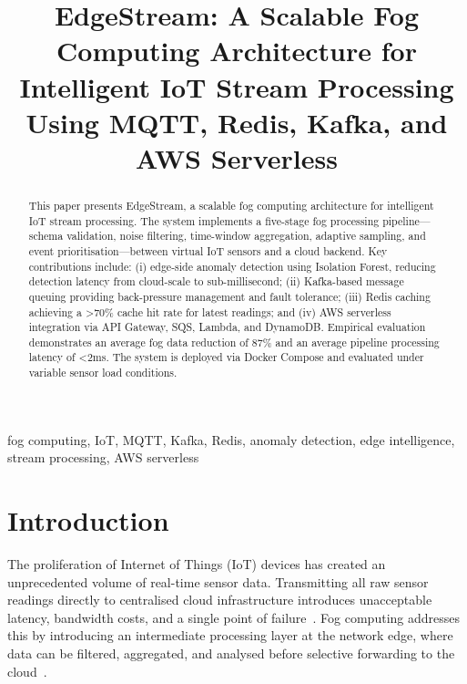 \documentclass[conference]{IEEEtran}
\begin{document}
\title{EdgeStream: A Scalable Fog Computing Architecture for Intelligent IoT Stream Processing Using MQTT, Redis, Kafka, and AWS Serverless}

\author{
}

\maketitle

\begin{abstract}
This paper presents EdgeStream, a scalable fog computing architecture for intelligent IoT stream processing. The system implements a five-stage fog processing pipeline—schema validation, noise filtering, time-window aggregation, adaptive sampling, and event prioritisation—between virtual IoT sensors and a cloud backend. Key contributions include: (i) edge-side anomaly detection using Isolation Forest, reducing detection latency from cloud-scale to sub-millisecond; (ii) Kafka-based message queuing providing back-pressure management and fault tolerance; (iii) Redis caching achieving a \textgreater70\% cache hit rate for latest readings; and (iv) AWS serverless integration via API Gateway, SQS, Lambda, and DynamoDB. Empirical evaluation demonstrates an average fog data reduction of 87\% and an average pipeline processing latency of \textless2ms. The system is deployed via Docker Compose and evaluated under variable sensor load conditions.
\end{abstract}

\begin{IEEEkeywords}
fog computing, IoT, MQTT, Kafka, Redis, anomaly detection, edge intelligence, stream processing, AWS serverless
\end{IEEEkeywords}

\section{Introduction}

The proliferation of Internet of Things (IoT) devices has created an unprecedented volume of real-time sensor data. Transmitting all raw sensor readings directly to centralised cloud infrastructure introduces unacceptable latency, bandwidth costs, and a single point of failure~\cite{bonomi2012fog}. Fog computing addresses this by introducing an intermediate processing layer at the network edge, where data can be filtered, aggregated, and analysed before selective forwarding to the cloud~\cite{shi2016edge}.
\end{document}
